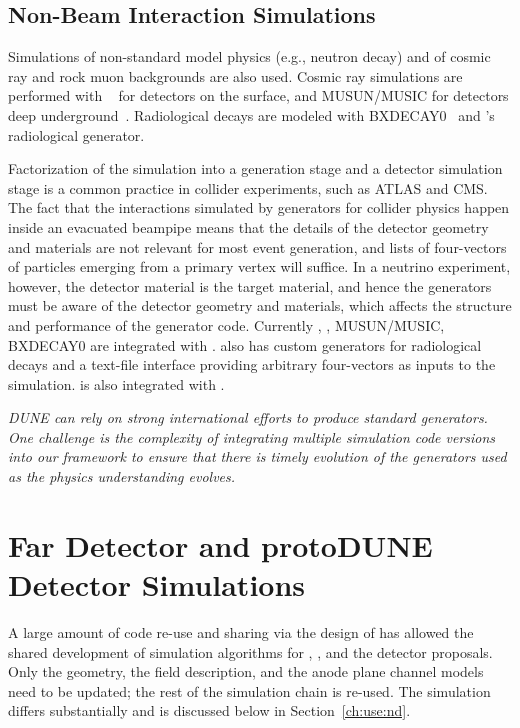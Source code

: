 \documentclass[../main-v1.tex]{subfiles}
\begin{document}
\subsection{Non-Beam Interaction Simulations}
Simulations of non-standard model physics (e.g., neutron decay) and of cosmic ray and rock muon backgrounds are also used.  Cosmic ray simulations are performed with ~\cite{Wentz:2003bp,Dembinski:2020wrp} for detectors on the surface, and MUSUN/MUSIC for detectors deep underground~\cite{Kudryavtsev:2008qh,LBNEDOCDB9673}.  Radiological decays are modeled with BXDECAY0~\cite{Ponkratenko:2000um} and 's  radiological generator.

Factorization of the simulation into a generation stage and a detector simulation stage is a common practice 
in collider experiments, such as ATLAS and CMS.  The fact that the interactions simulated by generators for collider physics happen inside an evacuated beampipe means that the details of the detector geometry and materials are not relevant for most event generation, and lists of four-vectors of particles emerging from a primary vertex will suffice.  In a neutrino experiment, however, the detector material is the target material, and hence the generators must be aware of the detector geometry and materials, which affects the structure and performance of the generator code.  Currently , , MUSUN/MUSIC, BXDECAY0 are integrated with .   also has custom generators for radiological decays and a text-file interface providing arbitrary four-vectors as inputs to the simulation.  is also integrated with .

{\it DUNE can rely on strong international efforts to produce standard generators. One challenge is the complexity of integrating multiple simulation code versions into our framework to ensure that there is timely evolution of the generators used as the physics understanding evolves.}

\section{Far Detector and protoDUNE Detector Simulations}

A large amount of code re-use and sharing via the design of  has allowed the shared development of simulation algorithms for , , 
and the   detector proposals.  Only the geometry, the field description,  and the anode plane channel models need to be updated; the rest of the simulation chain is re-used.  The  simulation differs substantially and is discussed below in 
Section~\ref{ch:use:nd}.
\end{document}
